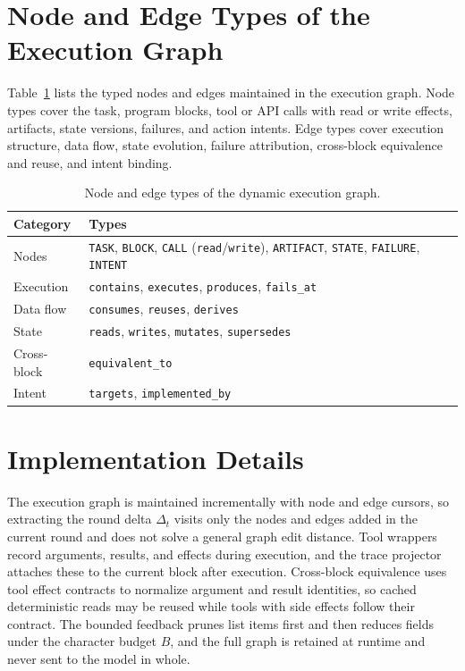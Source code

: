 \section{Node and Edge Types of the Execution Graph}
\label{app:types}

Table~\ref{tab:types} lists the typed nodes and edges maintained in the execution graph.
Node types cover the task, program blocks, tool or API calls with read or write effects, artifacts, state versions, failures, and action intents.
Edge types cover execution structure, data flow, state evolution, failure attribution, cross-block equivalence and reuse, and intent binding.

\begin{table}[h]
\centering\small
\setlength{\tabcolsep}{6pt}
\caption{Node and edge types of the dynamic execution graph.}
\label{tab:types}
\begin{tabular}{ll}
\toprule
\textbf{Category} & \textbf{Types} \\
\midrule
Nodes & \texttt{TASK}, \texttt{BLOCK}, \texttt{CALL} (\texttt{read}/\texttt{write}), \texttt{ARTIFACT}, \texttt{STATE}, \texttt{FAILURE}, \texttt{INTENT} \\
Execution & \texttt{contains}, \texttt{executes}, \texttt{produces}, \texttt{fails\_at} \\
Data flow & \texttt{consumes}, \texttt{reuses}, \texttt{derives} \\
State & \texttt{reads}, \texttt{writes}, \texttt{mutates}, \texttt{supersedes} \\
Cross-block & \texttt{equivalent\_to} \\
Intent & \texttt{targets}, \texttt{implemented\_by} \\
\bottomrule
\end{tabular}
\end{table}

\section{Implementation Details}
\label{app:impl}

The execution graph is maintained incrementally with node and edge cursors, so extracting the round delta $\Delta_t$ visits only the nodes and edges added in the current round and does not solve a general graph edit distance.
Tool wrappers record arguments, results, and effects during execution, and the trace projector attaches these to the current block after execution.
Cross-block equivalence uses tool effect contracts to normalize argument and result identities, so cached deterministic reads may be reused while tools with side effects follow their contract.
The bounded feedback prunes list items first and then reduces fields under the character budget $B$, and the full graph is retained at runtime and never sent to the model in whole.

